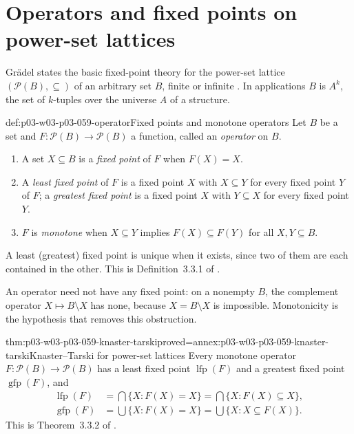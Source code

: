 \section{Operators and fixed points on power-set lattices}
\label{sec:p03-w03-p03-059-operators}

Gr\"adel states the basic fixed-point theory for the power-set lattice
\((\mathcal P(B),\subseteq)\) of an arbitrary set \(B\), finite or infinite
\cite[p.~153]{Gradel2007FMTDescriptiveChapter}. In applications \(B\) is \(A^k\), the set
of \(k\)-tuples over the universe \(A\) of a structure.

\begin{hbdefinition}{def:p03-w03-p03-059-operator}{Fixed points and monotone operators}
Let \(B\) be a set and \(F:\mathcal P(B)\to\mathcal P(B)\) a function,
called an \emph{operator} on \(B\).
\begin{enumerate}
 \item A set \(X\subseteq B\) is a \emph{fixed point} of \(F\) when
       \(F(X)=X\).
 \item A \emph{least fixed point} of \(F\) is a fixed point \(X\) with
       \(X\subseteq Y\) for every fixed point \(Y\) of \(F\); a
       \emph{greatest fixed point} is a fixed point \(X\) with
       \(Y\subseteq X\) for every fixed point \(Y\).
 \item \(F\) is \emph{monotone} when \(X\subseteq Y\) implies
       \(F(X)\subseteq F(Y)\) for all \(X,Y\subseteq B\).
\end{enumerate}
A least (greatest) fixed point is unique when it exists, since two of them
are each contained in the other. This is Definition~3.3.1 of
\cite[p.~153]{Gradel2007FMTDescriptiveChapter}.
\end{hbdefinition}

An operator need not have any fixed point: on a nonempty \(B\), the
complement operator \(X\mapsto B\setminus X\) has none, because
\(X=B\setminus X\) is impossible. Monotonicity is the hypothesis that
removes this obstruction.

\begin{hbtheorem}{thm:p03-w03-p03-059-knaster-tarski}{proved=annex:p03-w03-p03-059-knaster-tarski}{Knaster--Tarski for power-set lattices}
Every monotone operator \(F:\mathcal P(B)\to\mathcal P(B)\) has a least
fixed point \(\operatorname{lfp}(F)\) and a greatest fixed point
\(\operatorname{gfp}(F)\), and
\[
\begin{aligned}
 \operatorname{lfp}(F)&=\bigcap\{X:F(X)=X\}=\bigcap\{X:F(X)\subseteq X\},\\
 \operatorname{gfp}(F)&=\bigcup\{X:F(X)=X\}=\bigcup\{X:X\subseteq F(X)\}.
\end{aligned}
\]
This is Theorem~3.3.2 of \cite[p.~153]{Gradel2007FMTDescriptiveChapter}.
\end{hbtheorem}

